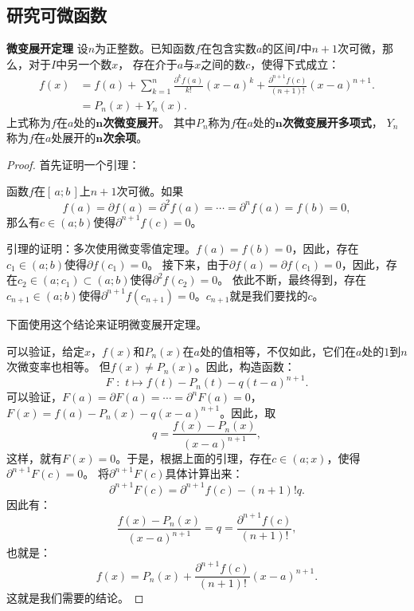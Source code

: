 \documentclass[12pt,UTF8,fontset=none]{ctexbook}
\begin{document}
\begin{appendix}
\section{研究可微函数}

\begin{tm}{\textbf{微变展开定理}}
    设$n$为正整数。已知函数$f$在包含实数$a$的区间$I$中$n+1$次可微，那么，对于$I$中另一个数$x$，
    存在介于$a$与$x$之间的数$c$，使得下式成立：
    \begin{align*}
        f(x) &= f(a) + \sum_{k=1}^n \frac{\partial^k f (a)}{k!}(x - a)^k + \frac{\partial^{n+1} f (c)}{(n+1)!}(x - a)^{n+1}.  \\
        &= P_n(x) + Y_n(x). 
    \end{align*}
    上式称为$f$在$a$处的$\boldsymbol{n}$\textbf{次微变展开}。
    其中$P_n$称为$f$在$a$处的$\boldsymbol{n}$\textbf{次微变展开多项式}，
    $Y_n$称为$f$在$a$处展开的$\boldsymbol{n}$\textbf{次余项}。
    
\end{tm}

\begin{proof}
    首先证明一个引理：

    函数$f$在$[\,a; b\,]$上$n+1$次可微。如果
    $$f(a) = \partial f(a) = \partial^2 f(a) = \cdots = \partial^{n} f(a) = f(b) = 0,$$
    那么有$c\in(a; b)$使得$\partial^{n+1} f(c) = 0$。

    引理的证明：多次使用微变零值定理。$f(a) = f(b) = 0$，因此，存在$c_1\in(a; b)$使得$\partial f (c_1) = 0$。
    接下来，由于$\partial f(a) = \partial f(c_1) = 0$，因此，存在$c_2\in(a; c_1)\subset(a; b)$使得$\partial^2 f (c_2) = 0$。
    依此不断，最终得到，存在$c_{n+1}\in(a; b)$使得$\partial^{n+1} f (c_{n+1}) = 0$。$c_{n+1}$就是我们要找的$c$。

    下面使用这个结论来证明微变展开定理。

    可以验证，给定$x$，$f(x)$和$P_n(x)$在$a$处的值相等，不仅如此，它们在$a$处的$1$到$n$次微变率也相等。
    但$f(x) \neq P_n(x)$。因此，构造函数：
    $$ F\,\,: \,\, t \mapsto f(t) - P_n(t) - q(t - a)^{n+1}. $$
    可以验证，$F(a) = \partial F(a) = \cdots = \partial^n F(a) = 0$，
    $F(x) = f(a) - P_n(x) - q(x - a)^{n+1}$。因此，取
    $$ q = \frac{f(x) - P_n(x)}{(x - a)^{n+1}}, $$
    这样，就有$F(x) = 0$。于是，根据上面的引理，存在$c\in(a; x)$，使得$\partial^{n+1} F(c) = 0$。
    将$\partial^{n+1} F(c)$具体计算出来：
    $$ \partial^{n+1} F(c) = \partial^{n+1} f(c) - (n+1)! q.$$
    因此有：
    $$ \frac{f(x) - P_n(x)}{(x - a)^{n+1}} = q = \frac{\partial^{n+1} f(c)}{(n+1)!}, $$
    也就是：
    $$ f(x) = P_n(x) + \frac{\partial^{n+1} f(c)}{(n+1)!} (x - a)^{n+1}. $$
    这就是我们需要的结论。
\end{proof}


\end{appendix}
\end{document}
